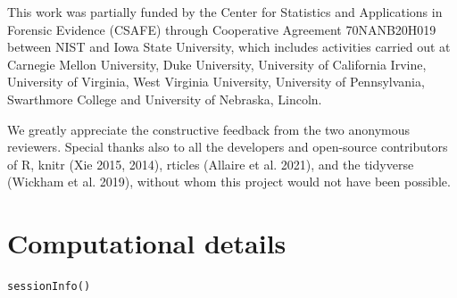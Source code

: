 This work was partially funded by the Center for Statistics and Applications in Forensic Evidence (CSAFE) through Cooperative Agreement 70NANB20H019 between NIST and Iowa State University, which includes activities carried out at Carnegie Mellon University, Duke University, University of California Irvine, University of Virginia, West Virginia University, University of Pennsylvania, Swarthmore College and University of Nebraska, Lincoln.

We greatly appreciate the constructive feedback from the two anonymous reviewers.
Special thanks also to all the developers and open-source contributors of R, knitr (Xie 2015, 2014), rticles (Allaire et al. 2021), and the tidyverse (Wickham et al. 2019), without whom this project would not have been possible.

\hypertarget{computational-details}{%
\section{Computational details}\label{computational-details}}

\begin{verbatim}
sessionInfo()
\end{verbatim}

